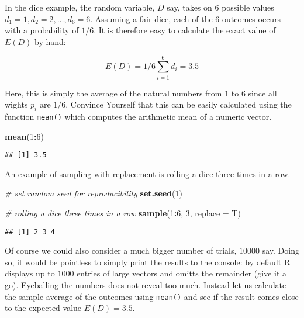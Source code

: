 \documentclass[]{book}
\newenvironment{Shaded}{\begin{snugshade}}{\end{snugshade}}
\newcommand{\KeywordTok}[1]{\textcolor[rgb]{0.13,0.29,0.53}{\textbf{#1}}}
\newcommand{\DataTypeTok}[1]{\textcolor[rgb]{0.13,0.29,0.53}{#1}}
\newcommand{\DecValTok}[1]{\textcolor[rgb]{0.00,0.00,0.81}{#1}}
\newcommand{\CommentTok}[1]{\textcolor[rgb]{0.56,0.35,0.01}{\textit{#1}}}
\newcommand{\OperatorTok}[1]{\textcolor[rgb]{0.81,0.36,0.00}{\textbf{#1}}}
\newcommand{\NormalTok}[1]{#1}
\theoremstyle{definition}
\theoremstyle{definition}
\theoremstyle{definition}
\theoremstyle{remark}
\begin{document}
In the dice example, the random variable, \(D\) say, takes on \(6\)
possible values \(d_1 = 1, d_2 = 2, \dots, d_6 = 6\). Assuming a fair
dice, each of the \(6\) outcomes occurs with a probability of \(1/6\).
It is therefore easy to calculate the exact value of \(E(D)\) by hand:

\[ E(D) = 1/6 \sum_{i=1}^6 d_i = 3.5 \]

Here, this is simply the average of the natural numbers from \(1\) to
\(6\) since all wights \(p_i\) are \(1/6\). Convince Yourself that this
can be easily calculated using the function \texttt{mean()} which
computes the arithmetic mean of a numeric vector.

\begin{Shaded}
\begin{Highlighting}[]
\KeywordTok{mean}\NormalTok{(}\DecValTok{1}\OperatorTok{:}\DecValTok{6}\NormalTok{)}
\end{Highlighting}
\end{Shaded}

\begin{verbatim}
## [1] 3.5
\end{verbatim}

An example of sampling with replacement is rolling a dice three times in
a row.

\begin{Shaded}
\begin{Highlighting}[]
\CommentTok{# set random seed for reproducibility}
\KeywordTok{set.seed}\NormalTok{(}\DecValTok{1}\NormalTok{)}

\CommentTok{# rolling a dice three times in a row}
\KeywordTok{sample}\NormalTok{(}\DecValTok{1}\OperatorTok{:}\DecValTok{6}\NormalTok{, }\DecValTok{3}\NormalTok{, }\DataTypeTok{replace =}\NormalTok{ T)}
\end{Highlighting}
\end{Shaded}

\begin{verbatim}
## [1] 2 3 4
\end{verbatim}

Of course we could also consider a much bigger number of trials,
\(10000\) say. Doing so, it would be pointless to simply print the
results to the console: by default R displays up to \(1000\) entries of
large vectors and omitts the remainder (give it a go). Eyeballing the
numbers does not reveal too much. Instead let us calculate the sample
average of the outcomes using \texttt{mean()} and see if the result
comes close to the expected value \(E(D)=3.5\).
\end{document}
